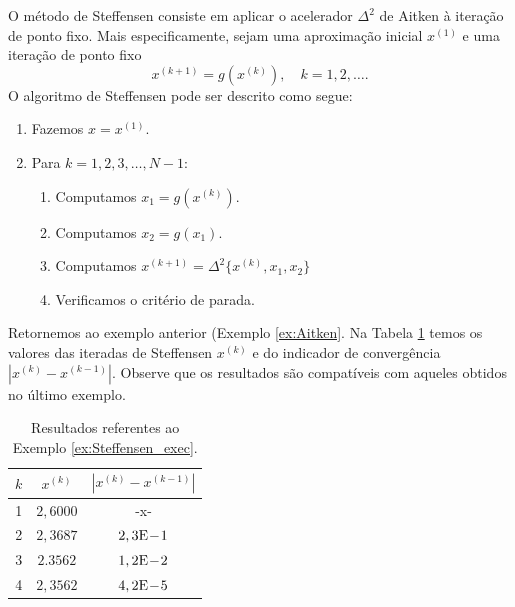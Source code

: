 O método de Steffensen consiste em aplicar o acelerador $\Delta^2$ de Aitken à iteração de ponto fixo. Mais especificamente, sejam uma aproximação inicial $x^{(1)}$ e uma iteração de ponto fixo
\begin{equation}
  x^{(k+1)} = g(x^{(k)}),\quad k=1,2,\ldots.
\end{equation}
O algoritmo de Steffensen pode ser descrito como segue:
\begin{enumerate}
\item Fazemos $x = x^{(1)}$.
\item Para $k=1,2,3,\dotsc, N-1$:
  \begin{enumerate}
  \item Computamos $x_1 = g(x^{(k)})$.
  \item Computamos $x_2 = g(x_1)$.
  \item Computamos $x^{(k+1)} = \Delta^2\{x^{(k)},x_1,x_2\}$
  \item Verificamos o critério de parada.
  \end{enumerate}
\end{enumerate}


\begin{ex}\label{ex:Steffensen_exec}
  Retornemos ao exemplo anterior (Exemplo \ref{ex:Aitken}. Na Tabela \ref{tab:ex_Steffensen_exec} temos os valores das iteradas de Steffensen $x^{(k)}$ e do indicador de convergência $|x^{(k)}-x^{(k-1)}|$. Observe que os resultados são compatíveis com aqueles obtidos no último exemplo.

\begin{table}[h!]
  \centering
  \caption{Resultados referentes ao Exemplo \ref{ex:Steffensen_exec}.}
  \label{tab:ex_Steffensen_exec}
  \begin{tabular}{r|cc}
    $k$ & $x^{(k)}$ & $|x^{(k)}-x^{(k-1)}|$ \\\hline
    1 & $2,6000$ & -x- \\
    2 & $2,3687$ & $2,3\mathrm{E}\!-\!1$ \\
    3 & $2.3562$ & $1,2\mathrm{E}\!-\!2$ \\
    4 & $2,3562$ & $4,2\mathrm{E}\!-\!5$ \\\hline
  \end{tabular}
\end{table}

% 
\end{ex}

